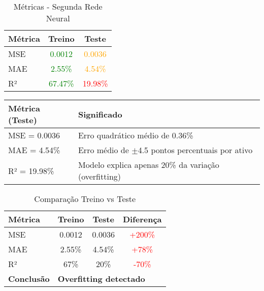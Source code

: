 
\begin{table}[h!]
\centering
\caption{Métricas - Segunda Rede Neural}
\begin{tabular}{lcc}
\toprule
\textbf{Métrica} & \textbf{Treino} & \textbf{Teste} \\
\midrule
MSE & \textcolor{green}{0.0012} & \textcolor{orange}{0.0036} \\
MAE & \textcolor{green}{2.55\%} & \textcolor{orange}{4.54\%} \\
R² & \textcolor{green}{67.47\%} & \textcolor{red}{19.98\%} \\
\bottomrule
\end{tabular}
\end{table}

\begin{table}[h!]
\centering
\small
\begin{tabular}{p{3.5cm}p{6cm}}
\toprule
\textbf{Métrica (Teste)} & \textbf{Significado} \\
\midrule
MSE = 0.0036 & Erro quadrático médio de 0.36\% \\
\midrule
MAE = 4.54\% & Erro médio de $\pm$4.5 pontos percentuais por ativo \\
\midrule
R² = 19.98\% & Modelo explica apenas 20\% da variação (overfitting) \\
\bottomrule
\end{tabular}
\end{table}

\begin{table}[h!]
\centering
\caption{Comparação Treino vs Teste}
\begin{tabular}{lccc}
\toprule
\textbf{Métrica} & \textbf{Treino} & \textbf{Teste} & \textbf{Diferença} \\
\midrule
MSE & 0.0012 & 0.0036 & \textcolor{red}{+200\%} \\
MAE & 2.55\% & 4.54\% & \textcolor{red}{+78\%} \\
R² & 67\% & 20\% & \textcolor{red}{-70\%} \\
\midrule
\textbf{Conclusão} & \multicolumn{3}{l}{\textbf{Overfitting detectado}} \\
\bottomrule
\end{tabular}
\end{table}

